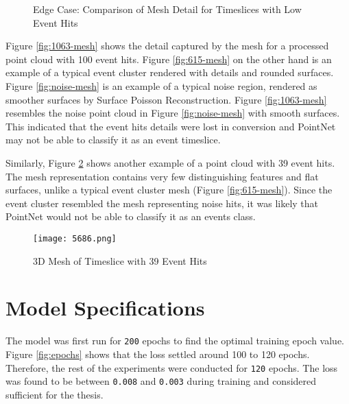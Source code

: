 \begin{figure}[ht!]   
\centering
{}

\hspace{0.01cm}
\caption[]{Edge Case: Comparison of Mesh Detail for Timeslices with Low Event Hits}
\label{fig:1063}
\end{figure}

Figure \ref{fig:1063-mesh} shows the detail captured by the mesh for a processed point cloud with 100 event hits.
Figure \ref{fig:615-mesh} on the other hand is an example of a typical event cluster rendered with details and rounded surfaces. Figure \ref{fig:noise-mesh} is an example of a typical noise region, rendered as smoother surfaces by Surface Poisson Reconstruction. Figure \ref{fig:1063-mesh} resembles the noise point cloud in Figure \ref{fig:noise-mesh} with smooth surfaces. This indicated that the event hits details were lost in conversion and PointNet may not be able to classify it as an event timeslice. 

Similarly, Figure \ref{fig:5686} shows another example of a point cloud with 39 event hits. The mesh representation contains very few distinguishing features and flat surfaces, unlike a typical event cluster mesh (Figure \ref{fig:615-mesh}). Since the event cluster resembled the mesh representing noise hits, it was likely that PointNet would not be able to classify it as an events class.

\begin{figure}[ht!]
    \centering
    \texttt{[image: 5686.png]}
    \caption{3D Mesh of Timeslice with 39 Event Hits}
    \label{fig:5686}
\end{figure}

\section{Model Specifications}
The model was first run for \texttt{200} epochs to find the optimal training epoch value. Figure \ref{fig:epochs} shows that the loss settled around 100 to 120 epochs. Therefore, the rest of the experiments were conducted for \texttt{120} epochs. The loss was found to be between \texttt{0.008} and \texttt{0.003} during training and considered sufficient for the thesis. 

